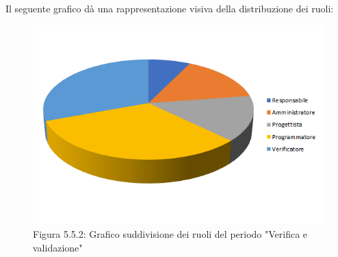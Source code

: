 Il seguente grafico dà una rappresentazione visiva della distribuzione dei ruoli: \\
\begin{figure} [H]
	\centering
	\includegraphics[scale=1]{Res/ExcelGrafici/Grafici/VerificaRuoli.png}
	\caption{Figura 5.5.2: Grafico suddivisione dei ruoli del periodo "Verifica e validazione"}\label{}
\end{figure}
 
\pagebreak